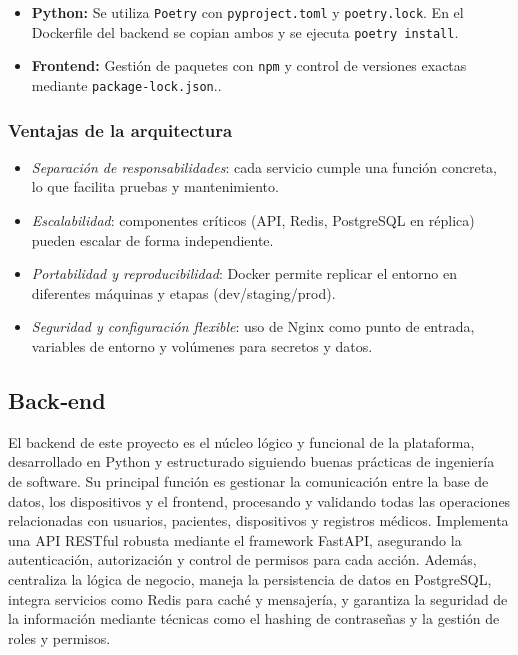 \documentclass[12pt, a4paper]{article}
\begin{document}
\begin{itemize}
	\item \textbf{Python:} Se utiliza \texttt{Poetry} con \texttt{pyproject.toml} y \texttt{poetry.lock}. En el Dockerfile del backend se copian ambos y se ejecuta \texttt{poetry install}.
	\item \textbf{Frontend:} Gestión de paquetes con \texttt{npm} y control de versiones exactas mediante \texttt{package-lock.json}..
\end{itemize}

\subsubsection{Ventajas de la arquitectura}
\begin{itemize}
	\item \emph{Separación de responsabilidades}: cada servicio cumple una función concreta, lo que facilita pruebas y mantenimiento.
	\item \emph{Escalabilidad}: componentes críticos (API, Redis, PostgreSQL en réplica) pueden escalar de forma independiente.
	\item \emph{Portabilidad y reproducibilidad}: Docker permite replicar el entorno en diferentes máquinas y etapas (dev/staging/prod).
	\item \emph{Seguridad y configuración flexible}: uso de Nginx como punto de entrada, variables de entorno y volúmenes para secretos y datos.
\end{itemize}


\subsection{Back‑end} 

El backend de este proyecto es el núcleo lógico y funcional de la plataforma, desarrollado en Python y estructurado siguiendo buenas prácticas de ingeniería de software. Su principal función es gestionar la comunicación entre la base de datos, los dispositivos y el frontend, procesando y validando todas las operaciones relacionadas con usuarios, pacientes, dispositivos y registros médicos. Implementa una API RESTful robusta mediante el framework FastAPI, asegurando la autenticación, autorización y control de permisos para cada acción. Además, centraliza la lógica de negocio, maneja la persistencia de datos en PostgreSQL, integra servicios como Redis para caché y mensajería, y garantiza la seguridad de la información mediante técnicas como el hashing de contraseñas y la gestión de roles y permisos.
\end{document}
